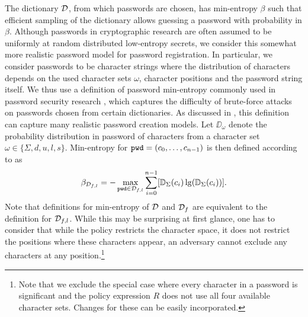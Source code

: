 The dictionary $\mathcal{D}$, from which passwords are chosen, has min-entropy $\beta$ such that efficient sampling of the dictionary allows guessing a password with probability in $\beta$.
Although passwords in cryptographic research are often assumed to be uniformly at random distributed low-entropy secrets, we consider this somewhat more realistic password model for password registration.
In particular, we consider passwords to be character strings where the distribution of characters depends on the used character sets $\omega$, character positions and the password string itself.
We thus use a definition of password min-entropy commonly used in password security research \cite{ShayKKLMBCC10,KomanduriSKMBCCE11,MazurekKVBCCKSU13}, which captures the difficulty of brute-force attacks on passwords chosen from certain dictionaries.
As discussed in \cite{ShayKKLMBCC10,KomanduriSKMBCCE11}, this definition can capture many realistic password creation models.
Let $\DD_\omega$ denote the probability distribution in password \pwd of characters from a character set $\omega\in\{\Sigma,d,u,l,s\}$.
Min-entropy for $\mathtt{pwd}=(c_0,\dots,c_{n-1})$ is then defined according to \citet{shannon48} as
\[
  \beta_{\mathcal{D}_{f,l}} = -\max_{\mathtt{pwd}\in \mathcal{D}_{f,l}} \sum_{i=0}^{n-1} [\mathbb{D}_\Sigma(c_i)\lg(\mathbb{D}_\Sigma(c_i))].
\]
Note that definitions for min-entropy of $\mathcal{D}$ and $\mathcal{D}_f$ are equivalent to the definition for $\mathcal{D}_{f,l}$.
While this may be surprising at first glance, one has to consider that while the policy restricts the character space, it does not restrict the positions where these characters appear, \ie an adversary cannot exclude any characters at any position.\footnote{Note that we exclude the special case where every character in a password is significant and the policy expression $R$ does not use all four available character sets. Changes for these can be easily incorporated.}


